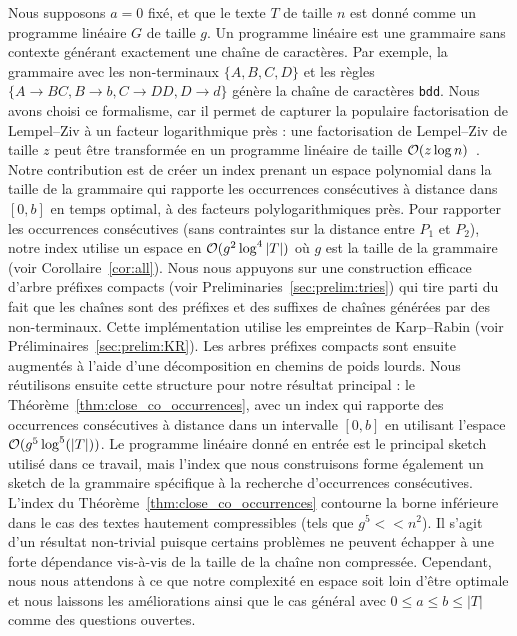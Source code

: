 Nous supposons $a=0$ fixé, et que le texte $T$ de taille $n$ est donné comme un programme linéaire $G$ de taille $g$. Un programme linéaire est une grammaire sans contexte générant exactement une chaîne de caractères. Par exemple, la grammaire avec les non-terminaux $\{A,B,C,D\}$ et les règles $\{A \rightarrow BC, B \rightarrow b, C \rightarrow DD, D\rightarrow d \}$ génère la chaîne de caractères \texttt{bdd}.
Nous avons choisi ce formalisme, car il permet de capturer la populaire factorisation de Lempel--Ziv à un facteur logarithmique près : une factorisation de Lempel--Ziv de taille $z$ peut être transformée en un programme linéaire de taille $\mathcal{O}(z\log n)$~\cite{CharikarLLPPRSS02,Rytter02}.
%
Notre contribution est de créer un index prenant un espace polynomial dans la taille de la grammaire qui rapporte les occurrences consécutives à distance dans $[0,b]$ en temps optimal, à des facteurs polylogarithmiques près.
Pour rapporter les occurrences consécutives (sans contraintes sur la distance entre $P_1$ et $P_2$), notre index utilise un espace en $\mathcal{O}(g^2\log^4|T|)$ où $g$ est la taille de la grammaire (voir Corollaire~\ref{cor:all}).
%
Nous nous appuyons sur une construction efficace d'arbre préfixes compacts (voir Preliminaries~\ref{sec:prelim:tries}) qui tire parti du fait que les chaînes sont des préfixes et des suffixes de chaînes générées par des non-terminaux. Cette implémentation utilise les empreintes de Karp--Rabin (voir Préliminaires~\ref{sec:prelim:KR}). Les arbres préfixes compacts sont ensuite augmentés à l'aide d'une décomposition en chemins de poids lourds.
Nous réutilisons ensuite cette structure pour notre résultat principal : le Théorème~\ref{thm:close_co_occurrences}, avec un index qui rapporte des occurrences consécutives à distance dans un intervalle $[0,b]$ en utilisant l'espace $\mathcal{O} (g^5\log^5(|T|))$.
%
Le programme linéaire donné en entrée est le principal sketch utilisé dans ce travail, mais l'index que nous construisons forme également un sketch de la grammaire spécifique à la recherche d'occurrences consécutives.
%
L'index du Théorème~\ref{thm:close_co_occurrences} contourne la borne inférieure dans le cas des textes hautement compressibles (tels que $g^5 << n^2$). Il s'agit d'un résultat non-trivial puisque certains problèmes ne peuvent échapper à une forte dépendance vis-à-vis de la taille de la chaîne non compressée. Cependant, nous nous attendons à ce que notre complexité en espace soit loin d'être optimale et nous laissons les améliorations ainsi que le cas général avec $0 \leq a \leq b \leq |T|$ comme des questions ouvertes.


